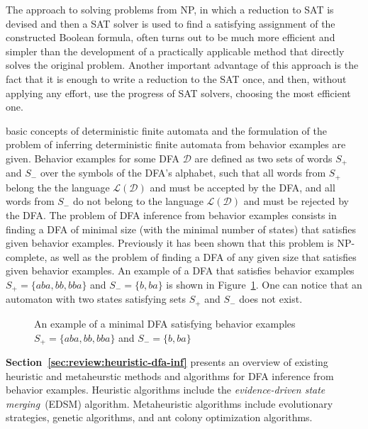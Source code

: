 The approach to solving problems from NP, in which a reduction to SAT is devised and then a SAT solver is used to find a satisfying
assignment of the constructed Boolean formula, often turns out to be much more efficient and simpler than the development of a practically applicable method that directly solves the original problem.
Another important advantage of this approach is the fact that it is enough to write a reduction to the SAT once, and then, without applying any effort, use the progress of SAT solvers, choosing the most efficient one.



\insectionen{\ref{sec:review:dfa-inf}} basic concepts of deterministic finite automata and the formulation of the problem of inferring deterministic finite automata from behavior examples are given.
Behavior examples for some DFA $\mathcal{D}$ are defined as two sets of words $S_{+}$ and $S_{-}$ over the symbols of the DFA's alphabet, such that all words from $S_{+}$ belong the the language $\mathcal{L}\left(\mathcal{D}\right)$ and must be accepted by the DFA, and all words from $S_{-}$ do not belong to the language $\mathcal{L}\left(\mathcal{D}\right)$ 
and must be rejected by  the DFA.
The problem of DFA inference from behavior examples consists in finding a DFA of minimal size (with the minimal number of states) that
satisfies given behavior examples.
Previously it has been shown that this problem is NP-complete, as well as the problem of finding a DFA of any given size that satisfies given behavior examples.
An example of a DFA that satisfies behavior examples $S_{+} = \{aba, bb, bba\}$ and $S_{-} = \{b, ba\}$ is shown in Figure~\ref{syn-en:img:dfa-ex}.
One can notice that an automaton with two states satisfying sets $S_{+}$ and $S_{-}$ does not exist.
\begin{figure}[ht]
  \centering
  \ifafour
    
  \else
    
  \fi
  \caption{An example of a minimal DFA satisfying behavior examples $S_{+} = \{aba, bb, bba\}$ and $S_{-} = \{b, ba\}$}
  \label{syn-en:img:dfa-ex}
\end{figure}

\textbf{Section~\ref{sec:review:heuristic-dfa-inf}} presents an overview of existing heuristic and metaheurstic methods and algorithms
for DFA inference from behavior examples.
Heuristic algorithms include the \emph{evidence-driven state merging}~(EDSM) algorithm.
Metaheuristic algorithms include evolutionary strategies, genetic algorithms, and ant colony optimization algorithms.

